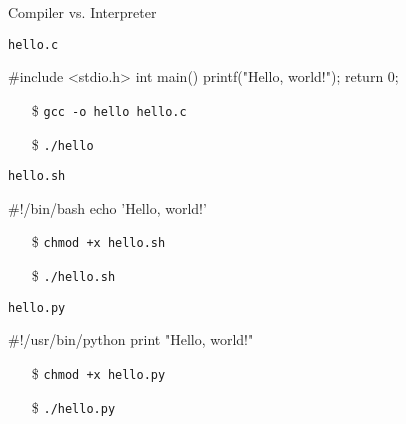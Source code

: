 \begin{frame}[fragile]{Compiler vs. Interpreter}
  \begin{block}{\texttt{hello.c}}
    \begin{minipage}{.5\linewidth}
\begin{ccode}
#include <stdio.h>
int main()
{
  printf("Hello, world!\n");
  return 0;
}
\end{ccode}
    \end{minipage}
    \begin{minipage}{.45\linewidth}
    \begin{itemize}
    \item[\$] \texttt{gcc -o hello hello.c}
    \item[\$] \texttt{./hello}
    \end{itemize}
    \end{minipage}
  \end{block}
  \begin{block}{\texttt{hello.sh}}
    \begin{minipage}{.5\linewidth}
      \begin{shellcode}
        #!/bin/bash
        echo 'Hello, world!'
      \end{shellcode}
    \end{minipage}
    \begin{minipage}{.45\linewidth}
      \begin{enumerate}
      \item[\$] \texttt{chmod +x hello.sh}
      \item[\$] \texttt{./hello.sh}
      \end{enumerate}
    \end{minipage}
  \end{block}
  \begin{block}{\texttt{hello.py}}
    \begin{minipage}{.5\linewidth}
\begin{pythoncode}
#!/usr/bin/python
print "Hello, world!"
\end{pythoncode}      
    \end{minipage}
    \begin{minipage}{.45\linewidth}
      \begin{enumerate}
      \item[\$] \texttt{chmod +x hello.py}
      \item[\$] \texttt{./hello.py}
      \end{enumerate}
    \end{minipage}
  \end{block}
\end{frame}

